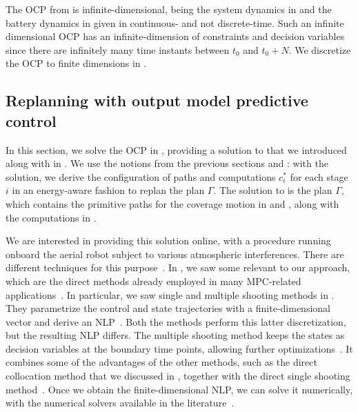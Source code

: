 The OCP from  is infinite-dimensional, being the system dynamics in  and the battery dynamics in  given in continuous- and not discrete-time. Such an infinite dimensional OCP has an infinite-dimension of constraints and decision variables since there are infinitely many time instants between $t_0$ and $t_0+N$. We discretize the OCP to finite dimensions in .

\subsection{Replanning with output model predictive control}
\label{sec:opt-cont-gener}

In this section, we solve the OCP in , providing a solution to  that we introduced along with  in . We use the notions from the previous sections and : with the solution, we derive the configuration of paths and computations $c_i^*$ for each stage $i$ in an energy-aware fashion to replan the plan $\Gamma$. The solution to  is the plan $\Gamma$, which contains the primitive paths for the coverage motion in  and , along with the computations in . 

We are interested in providing this solution online, with a procedure running onboard the aerial robot subject to various atmospheric interferences. There are different techniques for this purpose~\citep{grune2017nonlinear,rawlings2017model}. In , we saw some relevant to our approach, which are the direct methods already employed in many MPC-related applications~\citep{rawlings2017model}. In particular, we saw single and multiple shooting methods in . They parametrize the control and state trajectories with a finite-dimensional vector and derive an NLP~\citep{rawlings2017model}. Both the methods perform this latter discretization, but the resulting NLP differs. The multiple shooting method keeps the states as decision variables at the boundary time points, allowing further optimizations~\citep{rawlings2017model}. It combines some of the advantages of the other methods, such as the direct collocation method that we discussed in , together with the direct single shooting method~\citep{diehl2006fast,grune2017nonlinear}. Once we obtain the finite-dimensional NLP, we can solve it numerically, with the numerical solvers available in the literature~\citep{diehl2006fast,grune2017nonlinear,nocedal2006numerical}. 


